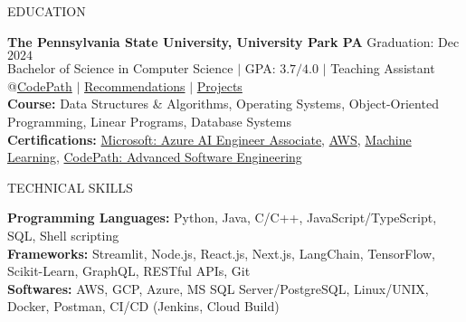 \documentclass{resume} %
\begin{document}

\begin{rSection}{EDUCATION}

{\bf The Pennsylvania State University, University Park PA} \hfill {Graduation: Dec $2024$}\\
{Bachelor of Science in Computer Science} $\vert$ GPA: $3.7/4.0$ $\vert$ Teaching Assistant @\href{https://www.codepath.org/en-us/volunteers/technical-interview-coaching}{CodePath} $\vert$ \href{https://www.linkedin.com/in/harshitjain17/details/recommendations/}{Recommendations} $\vert$ \href{https://www.linkedin.com/in/harshitjain17/details/projects/}{Projects}\\
{\bf Course:} Data Structures \& Algorithms, Operating Systems, Object-Oriented Programming, Linear Programs, Database Systems \\
{\bf Certifications:} \href{https://learn.microsoft.com/api/credentials/share/en-us/harshitjain17/36D25FDF9BE21293?sharingId=87F1F438F3879B8C}{Microsoft: Azure AI Engineer Associate}, \href{https://www.coursera.org/account/accomplishments/verify/7L8L8YQTMCPZ}{AWS}, \href{https://www.coursera.org/account/accomplishments/verify/JYX5UB5YP4YD}{Machine Learning}, \href{https://www.linkedin.com/in/harshitjain17/details/education/}{CodePath: Advanced Software Engineering}
\end{rSection}


\begin{rSection}{TECHNICAL SKILLS}

{\bf Programming Languages:} Python, Java, C/C++, JavaScript/TypeScript, SQL, Shell scripting\\
{\bf Frameworks:} Streamlit, Node.js, React.js, Next.js, LangChain, TensorFlow, Scikit-Learn, GraphQL, RESTful APIs, Git\\
{\bf Softwares:} AWS, GCP, Azure, MS SQL Server/PostgreSQL, Linux/UNIX, Docker, Postman, CI/CD (Jenkins, Cloud Build)

\end{rSection}
\end{document}
